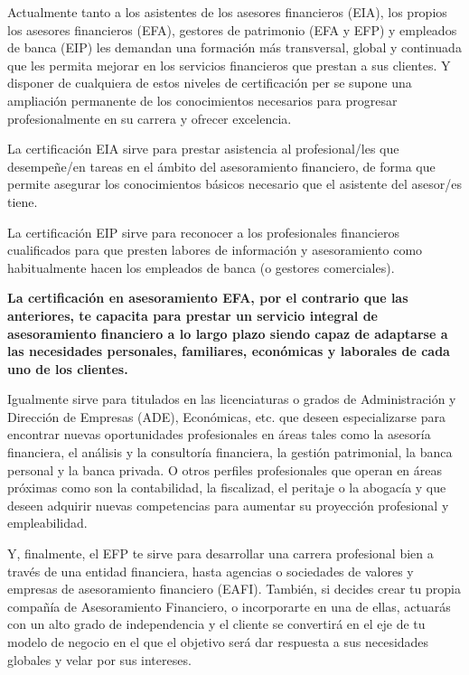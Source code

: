 \documentclass[
  letterpaper,
  DIV=11,
  numbers=noendperiod]{scrreprt}
\begin{document}

Actualmente tanto a los asistentes de los asesores financieros (EIA),
los propios los asesores financieros (EFA), gestores de patrimonio (EFA
y EFP) y empleados de banca (EIP) les demandan una formación más
transversal, global y continuada que les permita mejorar en los
servicios financieros que prestan a sus clientes. Y disponer de
cualquiera de estos niveles de certificación per se supone una
ampliación permanente de los conocimientos necesarios para progresar
profesionalmente en su carrera y ofrecer excelencia.

La certificación EIA sirve para prestar asistencia al profesional/les
que desempeñe/en tareas en el ámbito del asesoramiento financiero, de
forma que permite asegurar los conocimientos básicos necesario que el
asistente del asesor/es tiene.

La certificación EIP sirve para reconocer a los profesionales
financieros cualificados para que presten labores de información y
asesoramiento como habitualmente hacen los empleados de banca (o
gestores comerciales).

\textbf{La certificación en asesoramiento EFA, por el contrario que las
anteriores, te capacita para prestar un servicio integral de
asesoramiento financiero a lo largo plazo siendo capaz de adaptarse a
las necesidades personales, familiares, económicas y laborales de cada
uno de los clientes.}

Igualmente sirve para titulados en las licenciaturas o grados de
Administración y Dirección de Empresas (ADE), Económicas, etc. que
deseen especializarse para encontrar nuevas oportunidades profesionales
en áreas tales como la asesoría financiera, el análisis y la consultoría
financiera, la gestión patrimonial, la banca personal y la banca
privada. O otros perfiles profesionales que operan en áreas próximas
como son la contabilidad, la fiscalizad, el peritaje o la abogacía y que
deseen adquirir nuevas competencias para aumentar su proyección
profesional y empleabilidad.

Y, finalmente, el EFP te sirve para desarrollar una carrera profesional
bien a través de una entidad financiera, hasta agencias o sociedades de
valores y empresas de asesoramiento financiero (EAFI). También, si
decides crear tu propia compañía de Asesoramiento Financiero, o
incorporarte en una de ellas, actuarás con un alto grado de
independencia y el cliente se convertirá en el eje de tu modelo de
negocio en el que el objetivo será dar respuesta a sus necesidades
globales y velar por sus intereses.
\end{document}
